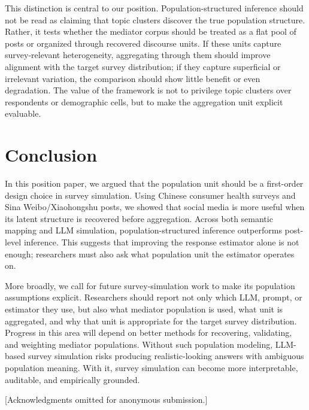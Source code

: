 \documentclass{article}
\begin{document}
This distinction is central to our position. Population-structured inference should not be
read as claiming that topic clusters discover the true population structure. Rather, it
tests whether the mediator corpus should be treated as a flat pool of posts or organized
through recovered discourse units. If these units capture survey-relevant heterogeneity, aggregating through them should
improve alignment with the target survey distribution; if they capture superficial or
irrelevant variation, the comparison should show little benefit or even degradation. The
value of the framework is not to privilege topic clusters over respondents or demographic
cells, but to make the aggregation unit explicit evaluable.

\section{Conclusion}
\label{sec:conclusion}

In this position paper, we argued that the population unit should be a first-order design choice in survey simulation.
Using Chinese consumer health surveys and Sina Weibo/Xiaohongshu posts, we showed that social media is more useful when its latent structure is recovered before aggregation.
Across both semantic mapping and LLM simulation, population-structured inference outperforms post-level inference.
This suggests that improving the response estimator alone is not enough; researchers must also ask what population unit the estimator operates on.

More broadly, we call for future survey-simulation work to make its population assumptions explicit.
Researchers should report not only which LLM, prompt, or estimator they use, but also what mediator population is used, what unit is aggregated, and why that unit is appropriate for the target survey distribution.
Progress in this area will depend on better methods for recovering, validating, and weighting mediator populations.
Without such population modeling, LLM-based survey simulation risks producing realistic-looking answers with ambiguous population meaning.
With it, survey simulation can become more interpretable, auditable, and empirically grounded.

\begin{ack}
[Acknowledgments omitted for anonymous submission.]
\end{ack}
\end{document}
